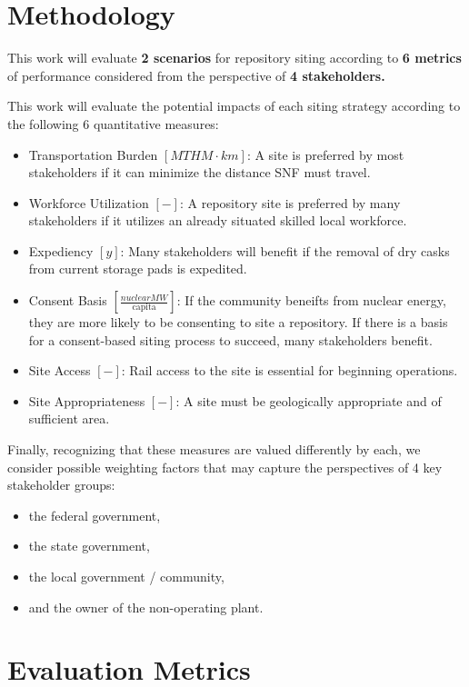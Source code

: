 \section{Methodology}

This work will evaluate \textbf{2 scenarios} for repository siting according to \textbf{6 metrics} of 
performance considered from the perspective of \textbf{4 stakeholders.}

This work will evaluate the potential impacts of each siting strategy according 
to the following 6 quantitative measures:

\begin{itemize}
	\item Transportation Burden $[MTHM \cdot km]$: A site is preferred by 
	most stakeholders if it can minimize the distance \gls{SNF} 
	must travel.
	\item Workforce Utilization $[-]$: A repository site is preferred by 
	many stakeholders if it utilizes an already situated skilled local 
	workforce. 
	\item Expediency $[y]$: Many stakeholders will benefit if the removal 
	of dry casks from current storage pads is expedited.
	\item Consent Basis $[\frac{nuclear MW}{\mbox{capita}}]$: If the community
	 beneifts from nuclear energy, they are more likely to be consenting to
	 site a repository. If there is a basis for a consent-based 
	siting process to succeed, many stakeholders benefit.
	\item Site Access $[-]$: Rail access to the site is essential for 
	beginning operations.
	\item Site Appropriateness $[-]$: A site must be geologically 
	appropriate and of sufficient area.
\end{itemize}

Finally, recognizing that these measures are valued differently by each, we
consider possible weighting factors that may capture the perspectives of 4 key
stakeholder groups:

\begin{itemize}
	\item the federal government,
	\item the state government,
	\item the local government / community,
	\item and the owner of the non-operating plant.
\end{itemize}


\section{Evaluation Metrics}

